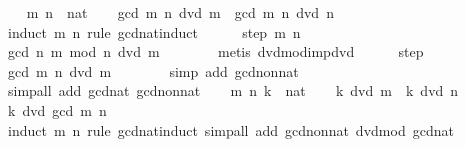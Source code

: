 \begin{isabellebody}
%
\isatagproof
{}\isamarkupfalse%
\isanewline
\ \ \isamarkupfalse%
\ m\ n\ {\isacharcolon}{\kern0pt}{\isacharcolon}{\kern0pt}\ nat\isanewline
\ \ \isamarkupfalse%
\ {\isachardoublequoteopen}gcd\ m\ n\ dvd\ m{\isachardoublequoteclose}\ \ {\isachardoublequoteopen}gcd\ m\ n\ dvd\ n{\isachardoublequoteclose}\isanewline
\ \ \isamarkupfalse%
\ {\isacharparenleft}{\kern0pt}induct\ m\ n\ rule{\isacharcolon}{\kern0pt}\ gcd{\isacharunderscore}{\kern0pt}nat{\isacharunderscore}{\kern0pt}induct{\isacharparenright}{\kern0pt}\isanewline
\ \ \ \ \isamarkupfalse%
\ {\isacharparenleft}{\kern0pt}step\ m\ n{\isacharparenright}{\kern0pt}\isanewline
\ \ \ \ \isamarkupfalse%
\ \isamarkupfalse%
\ {\isachardoublequoteopen}gcd\ n\ {\isacharparenleft}{\kern0pt}m\ mod\ n{\isacharparenright}{\kern0pt}\ dvd\ m{\isachardoublequoteclose}\isanewline
\ \ \ \ \ \ \isamarkupfalse%
\ {\isacharparenleft}{\kern0pt}metis\ dvd{\isacharunderscore}{\kern0pt}mod{\isacharunderscore}{\kern0pt}imp{\isacharunderscore}{\kern0pt}dvd{\isacharparenright}{\kern0pt}\isanewline
\ \ \ \ \isamarkupfalse%
\ step\ \isamarkupfalse%
\ {\isachardoublequoteopen}gcd\ m\ n\ dvd\ m{\isachardoublequoteclose}\isanewline
\ \ \ \ \ \ \isamarkupfalse%
\ {\isacharparenleft}{\kern0pt}simp\ add{\isacharcolon}{\kern0pt}\ gcd{\isacharunderscore}{\kern0pt}non{\isacharunderscore}{\kern0pt}{}{\isacharunderscore}{\kern0pt}nat{\isacharparenright}{\kern0pt}\isanewline
\ \ \isamarkupfalse%
\ {\isacharparenleft}{\kern0pt}simp{\isacharunderscore}{\kern0pt}all\ add{\isacharcolon}{\kern0pt}\ gcd{\isacharunderscore}{\kern0pt}{}{\isacharunderscore}{\kern0pt}nat\ gcd{\isacharunderscore}{\kern0pt}non{\isacharunderscore}{\kern0pt}{}{\isacharunderscore}{\kern0pt}nat{\isacharparenright}{\kern0pt}\isanewline
{}\isamarkupfalse%
\isanewline
\ \ \isamarkupfalse%
\ m\ n\ k\ {\isacharcolon}{\kern0pt}{\isacharcolon}{\kern0pt}\ nat\isanewline
\ \ \isamarkupfalse%
\ {\isachardoublequoteopen}k\ dvd\ m{\isachardoublequoteclose}\ \ {\isachardoublequoteopen}k\ dvd\ n{\isachardoublequoteclose}\isanewline
\ \ \isamarkupfalse%
\ \isamarkupfalse%
\ {\isachardoublequoteopen}k\ dvd\ gcd\ m\ n{\isachardoublequoteclose}\isanewline
\ \ \ \ \isamarkupfalse%
\ {\isacharparenleft}{\kern0pt}induct\ m\ n\ rule{\isacharcolon}{\kern0pt}\ gcd{\isacharunderscore}{\kern0pt}nat{\isacharunderscore}{\kern0pt}induct{\isacharparenright}{\kern0pt}\ {\isacharparenleft}{\kern0pt}simp{\isacharunderscore}{\kern0pt}all\ add{\isacharcolon}{\kern0pt}\ gcd{\isacharunderscore}{\kern0pt}non{\isacharunderscore}{\kern0pt}{}{\isacharunderscore}{\kern0pt}nat\ dvd{\isacharunderscore}{\kern0pt}mod\ gcd{\isacharunderscore}{\kern0pt}{}{\isacharunderscore}{\kern0pt}nat{\isacharparenright}{\kern0pt}\isanewline

\end{isabellebody}
